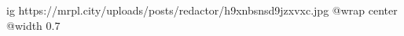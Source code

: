  
 
 
 
 

\ifcmt
  ig https://mrpl.city/uploads/posts/redactor/h9xnbsnsd9jzxvxc.jpg
  @wrap center
  @width 0.7
\fi
